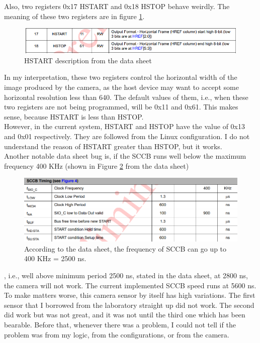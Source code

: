 \documentclass{article}
\begin{document}
	Also, two registers 0x17 HSTART and 0x18 HSTOP behave weirdly. The meaning of these two registers are in figure \ref{fig:hstart}.
	\begin{figure}[h]
		\centering
		\includegraphics[scale=0.68]{hstart}
		\caption{HSTART description from the data sheet}
		\label{fig:hstart}
	\end{figure} In my interpretation, these two registers control the horizontal width of the image produced by the camera, as the host device may want to accept some horizontal resolution less than 640. The default values of them, i.e., when these two registers are not being programmed, will be 0x11 and 0x61. This makes sense, because HSTART is less than HSTOP.
	\\
	
	However, in the current system, HSTART and HSTOP have the value of 0x13 and 0x01 respectively. They are followed from the Linux configuration. I do not understand the reason of HSTART greater than HSTOP, but it works.
	\\
	
	Another notable data sheet bug is, if the SCCB runs well below the maximum frequency 400 KHz (shown in Figure \ref{fig:sccbtiming} from the data sheet)
	\begin{figure}[h]
		\centering
		\includegraphics[scale=0.57]{sccbtiming}
		\caption{According to the data sheet, the frequency of SCCB can go up to 400 KHz = 2500 ns.}
		\label{fig:sccbtiming}
	\end{figure}, i.e., well above minimum period 2500 ns, stated in the data sheet, at 2800 ns, the camera will not work. The current implemented SCCB speed runs at 5600 ns.
	\\
	
	To make matters worse, this camera sensor by itself has high variations. The first sensor that I borrowed from the laboratory straight up did not work. The second did work but was not great, and it was not until the third one which has been bearable. Before that, whenever there was a problem, I could not tell if the problem was from my logic, from the configurations, or from the camera.
	\\
	
\end{document}
